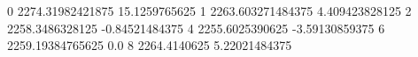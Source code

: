 0 2274.31982421875 15.1259765625
1 2263.603271484375 4.409423828125
2 2258.3486328125 -0.84521484375
4 2255.6025390625 -3.59130859375
6 2259.19384765625 0.0
8 2264.4140625 5.22021484375
